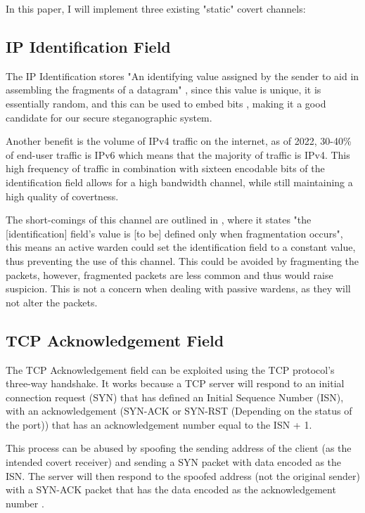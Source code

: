 In this paper, I will implement three existing "static" covert channels:

\subsection{IP Identification Field}

The IP Identification stores "An identifying value assigned by the sender to aid in assembling the fragments of a datagram" \citep{rfc791}, since this value is unique, it is essentially random, and this can be used to embed bits \citep{EoIICCA}, making it a good candidate for our secure steganographic system.

Another benefit is the volume of IPv4 traffic on the internet, as of 2022, 30-40\% of end-user traffic is IPv6 \citep{I10YO} which means that the majority of traffic is IPv4. This high frequency of traffic in combination with sixteen encodable bits of the identification field allows for a high bandwidth channel, while still maintaining a high quality of covertness.

The short-comings of this channel are outlined in \cite{rfc6864}, where it states "the [identification] field's value is [to be] defined only when fragmentation occurs", this means an active warden could set the identification field to a constant value, thus preventing the use of this channel. This could be avoided by fragmenting the packets, however, fragmented packets are less common and thus would raise suspicion. This is not a concern when dealing with passive wardens, as they will not alter the packets.

\subsection{TCP Acknowledgement Field}

The TCP Acknowledgement field can be exploited using the TCP protocol's three-way handshake. It works because a TCP server will respond to an initial connection request (SYN) that has defined an Initial Sequence Number (ISN), with an acknowledgement (SYN-ACK or SYN-RST (Depending on the status of the port)) that has an acknowledgement number equal to the ISN + 1.

This process can be abused by spoofing the sending address of the client (as the intended covert receiver) and sending a SYN packet with data encoded as the ISN. The server will then respond to the spoofed address (not the original sender) with a SYN-ACK packet that has the data encoded as the acknowledgement number \citep{CCitTCPIPPS}.


